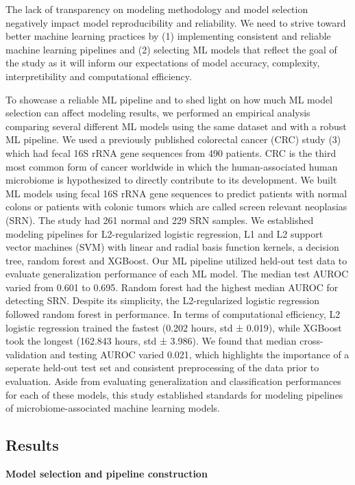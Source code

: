 \documentclass[11pt,]{article}
\begin{document}
The lack of transparency on modeling methodology and model selection
negatively impact model reproducibility and reliability. We need to
strive toward better machine learning practices by (1) implementing
consistent and reliable machine learning pipelines and (2) selecting ML
models that reflect the goal of the study as it will inform our
expectations of model accuracy, complexity, interpretibility and
computational efficiency.

To showcase a reliable ML pipeline and to shed light on how much ML
model selection can affect modeling results, we performed an empirical
analysis comparing several different ML models using the same dataset
and with a robust ML pipeline. We used a previously published colorectal
cancer (CRC) study (3) which had fecal 16S rRNA gene sequences from 490
patients. CRC is the third most common form of cancer worldwide in which
the human-associated human microbiome is hypothesized to directly
contribute to its development. We built ML models using fecal 16S rRNA
gene sequences to predict patients with normal colons or patients with
colonic tumors which are called screen relevant neoplasias (SRN). The
study had 261 normal and 229 SRN samples. We established modeling
pipelines for L2-regularized logistic regression, L1 and L2 support
vector machines (SVM) with linear and radial basis function kernels, a
decision tree, random forest and XGBoost. Our ML pipeline utilized
held-out test data to evaluate generalization performance of each ML
model. The median test AUROC varied from 0.601 to 0.695. Random forest
had the highest median AUROC for detecting SRN. Despite its simplicity,
the L2-regularized logistic regression followed random forest in
performance. In terms of computational efficiency, L2 logistic
regression trained the fastest (0.202 hours, std ± 0.019), while XGBoost
took the longest (162.843 hours, std ± 3.986). We found that median
cross-validation and testing AUROC varied 0.021, which highlights the
importance of a seperate held-out test set and consistent preprocessing
of the data prior to evaluation. Aside from evaluating generalization
and classification performances for each of these models, this study
established standards for modeling pipelines of microbiome-associated
machine learning models.

\subsection{Results}\label{results}

\textbf{Model selection and pipeline construction}
\end{document}
